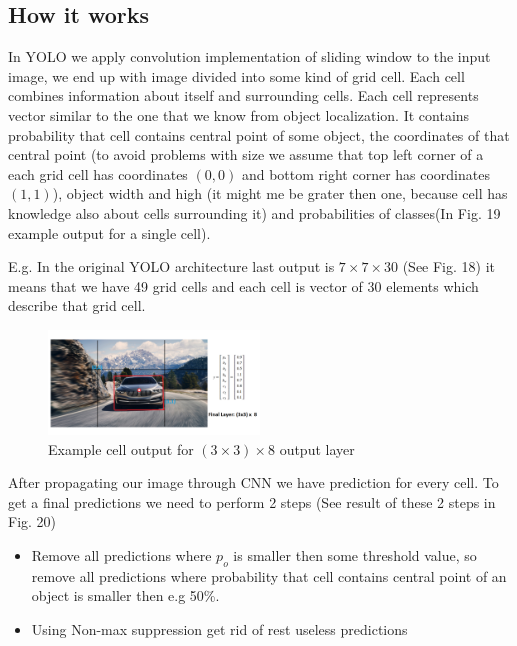 \documentclass[letterpaper, 10 pt, conference]{ieeeconf}  %
\begin{document}
\subsection{How it works}
In YOLO we apply convolution implementation of sliding window to the input image, we end up with image divided into some kind of grid cell. Each cell combines information about itself and surrounding cells. Each cell represents vector similar to the one that we know from object localization. It contains probability that cell contains central point of some object, the coordinates of that central point (to avoid problems with size we assume that top left corner of a each grid cell has coordinates $(0,0)$ and bottom right corner has coordinates $(1,1)$), object width and high (it might me be grater then one, because cell has knowledge also about cells surrounding it) and probabilities of classes(In Fig. 19 example output for a single cell). 

E.g. In the original YOLO architecture last output is $7 \times 7 \times 30$ (See Fig. 18) it means that we have 49 grid cells and each cell is vector of 30 elements which describe that grid cell. 

\begin{figure}[!ht]
	\centering
    \includegraphics[width=0.5\textwidth]{Pictures/YOLOExampleOutput2.png}
	\caption{Example cell output for $ (3\times 3) \times 8$ output layer}
\end{figure}

After propagating our image through CNN we have prediction for every cell. To get a final predictions we need to perform 2 steps (See result of these 2 steps in Fig. 20)

\begin{itemize}

\item Remove all predictions where $p_o$ is smaller then some threshold value, so remove all predictions where probability that cell contains central point of an object is smaller then e.g 50\%.  

\item Using Non-max suppression get rid of rest useless predictions
\end{itemize}
\end{document}

